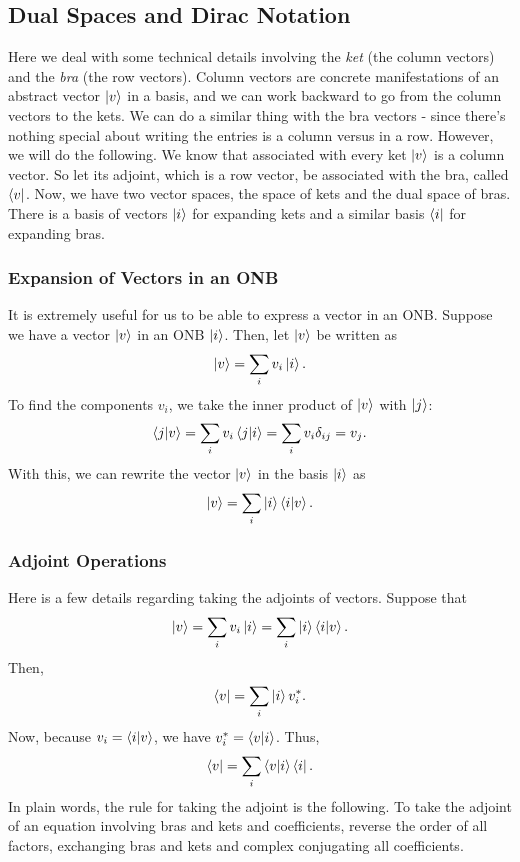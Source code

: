 \documentclass{book}
\theoremstyle{definition}
\begin{document}
\subsection{Dual Spaces and Dirac Notation}
Here we deal with some technical details involving the \textit{ket} (the column vectors) and the \textit{bra} (the row vectors). Column vectors are concrete manifestations of an abstract vector $\ket{v}$ in a basis, and we can work backward to go from the column vectors to the kets. We can do a similar thing with the bra vectors - since there's nothing special about writing the entries is a column versus in a row. However, we will do the following. We know that associated with every ket $\ket{v}$ is a column vector. So let its adjoint, which is a row vector, be associated with the bra, called $\bra{v}$. Now, we have two vector spaces, the space of kets and the dual space of bras. There is a basis of vectors $\ket{i}$ for expanding kets and a similar basis $\bra{i}$ for expanding bras. 

\subsubsection{Expansion of Vectors in an ONB}
It is extremely useful for us to be able to express a vector in an ONB. Suppose we have a vector $\ket{v}$ in an ONB $\ket{i}$. Then, let $\ket{v}$ be written as
\begin{align}
\ket{v} = \sum_i v_i \ket{i}.
\end{align}
To find the components $v_i$, we take the inner product of $\ket{v}$ with $\ket{j}$:
\begin{align}
\braket{j}{v} = \sum_i v_i \braket{j}{i} = \sum_i v_i\delta_{ij} = v_j.
\end{align}
With this, we can rewrite the vector $\ket{v}$ in the basis $\ket{i}$ as
\begin{align}
\ket{v} = \sum_i \ket{i}\braket{i}{v}.
\end{align}



\subsubsection{Adjoint Operations}
Here is a few details regarding taking the adjoints of vectors. Suppose that
\begin{align}
\ket{v} = \sum_i v_i\ket{i} = \sum_i \ket{i}\braket{i}{v}.
\end{align}
Then,
\begin{align}
\bra{v} = \sum_i\ket{i}v_i^*.
\end{align}
Now, because $v_i = \braket{i}{v}$, we have $v_i^* = \braket{v}{i}$. Thus, 
\begin{align}
\bra{v} = \sum_i \braket{v}{i}\bra{i}.
\end{align}
In plain words, the rule for taking the adjoint is the following. To take the adjoint of an equation involving bras and kets and coefficients, reverse the order of all factors, exchanging bras and kets and complex conjugating all coefficients. 
\end{document}
